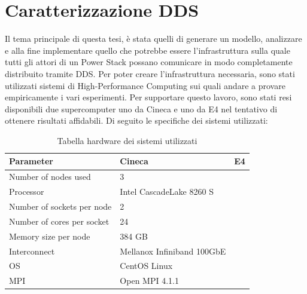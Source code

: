 \chapter{Caratterizzazione DDS}
Il tema principale di questa tesi, è stata quelli di generare un modello, analizzare e alla fine implementare quello che potrebbe essere l'infrastruttura sulla quale tutti gli attori di un Power Stack 
possano comunicare in modo completamente distribuito tramite DDS. Per poter creare l'infrastruttura necessaria, sono stati utilizzati sistemi di High-Performance Computing sui quali andare a provare empiricamente i vari esperimenti. Per supportare questo lavoro, sono stati resi disponibili due supercomputer uno da Cineca\cite{Cineca} e uno da E4\cite{E4} nel tentativo di ottenere risultati affidabili. Di seguito le specifiche dei sistemi utilizzati:

\begin{table}[H]
\begin{center}
\begin{tabular}{l|l|l}
    \hline
    \textbf{Parameter} & \textbf{Cineca} & \textbf{E4} \\
    \hline
    Number of nodes used & 3 \\
    \hline
    Processor & Intel CascadeLake 8260 S \\
    \hline
    Number of sockets per node & 2 \\
    \hline
    Number of cores per socket & 24 \\
    \hline
    Memory size per node & 384 GB \\
    \hline
    Interconnect & Mellanox Infiniband 100GbE \\
    \hline
    OS & CentOS Linux \\ 
    \hline
    MPI & Open MPI  4.1.1 \\
    \hline
\end{tabular}
\end{center}
\caption{Tabella hardware dei sistemi utilizzati}
\label{table:hpc-cineca}
\end{table}


